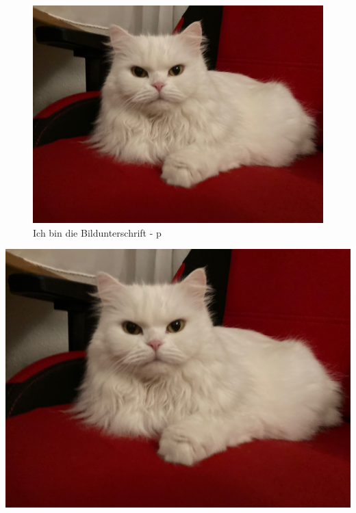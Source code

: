 \documentclass[12pt,ngerman]{scrartcl}
\begin{document}
\begin{figure}[p] %
\includegraphics[width=\textwidth]{Bilder/Katze}
\caption{Ich bin die Bildunterschrift - p}
\end{figure}

\blindtext[4]\vspace*{1em}


\includegraphics[width=\textwidth]{Bilder/Katze}
\end{document}
